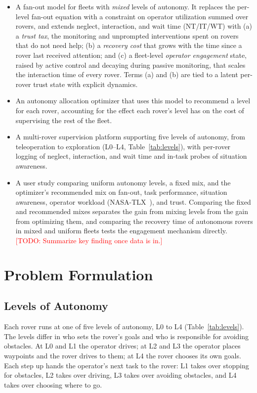 \documentclass[conference]{IEEEtran}
\newcommand{\todo}[1]{\textcolor{red}{[TODO: #1]}}
\begin{document}
\begin{itemize}
  \item A fan-out model for fleets with \emph{mixed} levels of
        autonomy. It replaces the per-level fan-out equation with a
        constraint on operator utilization summed over rovers, and
        extends neglect, interaction, and wait time (NT/IT/WT) with
        (a) a \emph{trust tax}, the monitoring and unprompted
        interventions spent on rovers that do not need help;
        (b) a \emph{recovery cost} that grows with the time since a
        rover last received attention; and (c) a fleet-level
        \emph{operator engagement} state, raised by active control and
        decaying during passive monitoring, that scales the
        interaction time of every rover. Terms (a) and (b) are tied to
        a latent per-rover trust state with explicit dynamics.
  \item An autonomy allocation optimizer that uses this model to
        recommend a level for each rover, accounting for the effect
        each rover's level has on the cost of supervising the rest of
        the fleet.
  \item A multi-rover supervision platform supporting five levels of
        autonomy, from teleoperation to exploration (L0--L4,
        Table~\ref{tab:levels}), with per-rover logging of neglect,
        interaction, and wait time and in-task probes of situation
        awareness.
  \item A user study comparing uniform autonomy levels, a fixed mix,
        and the optimizer's recommended mix on fan-out, task
        performance, situation awareness, operator workload
        (NASA-TLX~\cite{hart1988development}), and trust. Comparing
        the fixed and recommended mixes separates the gain from
        mixing levels from the gain from optimizing them, and
        comparing the recovery time of autonomous rovers in mixed and
        uniform fleets tests the engagement mechanism directly.
        \todo{Summarize key finding once data is in.}
\end{itemize}


\section{Problem Formulation}
\label{sec:problem}

\subsection{Levels of Autonomy}
\label{sec:levels}
Each rover runs at one of five levels of autonomy, L0 to L4
(Table~\ref{tab:levels}). The levels differ in who sets the rover's
goals and who is responsible for avoiding obstacles. At L0 and L1 the
operator drives; at L2 and L3 the operator places waypoints and the
rover drives to them; at L4 the rover chooses its own goals. Each step
up hands the operator's next task to the rover: L1 takes over
stopping for obstacles, L2 takes over driving, L3 takes over avoiding
obstacles, and L4 takes over choosing where to go.
\end{document}
